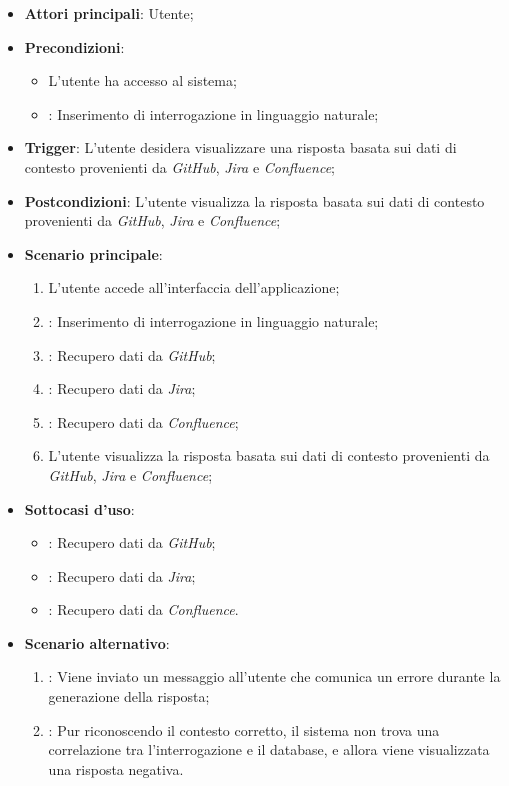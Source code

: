 \begin{itemize}
    \item \textbf{Attori principali}: Utente;
    \item \textbf{Precondizioni}: 
    \begin{itemize}
        \item L'utente ha accesso al sistema;
        \item {}: Inserimento di interrogazione in linguaggio naturale;
    \end{itemize}
    \item \textbf{Trigger}: L'utente desidera visualizzare una risposta basata sui dati di contesto provenienti da \emph{GitHub}, \emph{Jira} e \emph{Confluence};
    \item \textbf{Postcondizioni}: L'utente visualizza la risposta basata sui dati di contesto provenienti da \emph{GitHub}, \emph{Jira} e \emph{Confluence};
    \item \textbf{Scenario principale}:
    \begin{enumerate}
        \item L'utente accede all'interfaccia dell'applicazione;
        \item {}: Inserimento di interrogazione in linguaggio naturale;
        \item {}: Recupero dati da \emph{GitHub};
        \item {}: Recupero dati da \emph{Jira};
        \item {}: Recupero dati da \emph{Confluence};
        \item L'utente visualizza la risposta basata sui dati di contesto provenienti da \emph{GitHub}, \emph{Jira} e \emph{Confluence};
    \end{enumerate}
    \item \textbf{Sottocasi d'uso}:
    \begin{itemize}
        \item {}: Recupero dati da \emph{GitHub};
        \item {}: Recupero dati da \emph{Jira};
        \item {}: Recupero dati da \emph{Confluence}.
    \end{itemize}
    \item \textbf{Scenario alternativo}:
    \begin{enumerate}
        \item {}: Viene inviato un messaggio all'utente che comunica un errore durante la generazione della risposta;
        \item {}: Pur riconoscendo il contesto corretto, il sistema non trova una correlazione tra l'interrogazione e il database, e allora viene visualizzata una risposta negativa.
    \end{enumerate}
\end{itemize}

